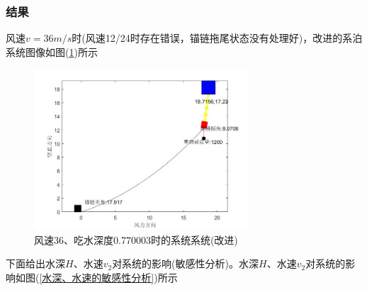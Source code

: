 \documentclass[UTF8]{ctexbook}
\theoremstyle{nonumberplain}
\begin{document}
        \subsubsection{结果}
            \par
            风速$v=36m/s$时(风速12/24时存在错误，锚链拖尾状态没有处理好)，改进的系泊系统图像如图(\ref{风速36、吃水深度0.770003时的系统系统(改进)})所示
            \begin{figure}[H]
                \centering
                \includegraphics[width=8cm]{images/v_wind_36_h_xitong_gaijin.jpg}
                \caption{风速36、吃水深度0.770003时的系统系统(改进)}
                \label{风速36、吃水深度0.770003时的系统系统(改进)}
            \end{figure}
            \par
            下面给出水深$H$、水速$v_2$对系统的影响(敏感性分析)。水深$H$、水速$v_2$对系统的影响如图(\ref{水深、水速的敏感性分析})所示
\end{document}
